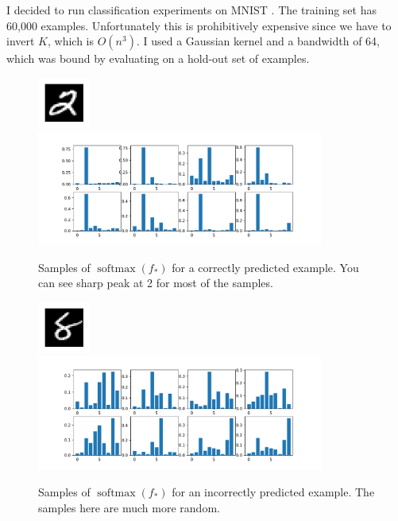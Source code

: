 \documentclass[letterpaper]{article}
\begin{document}
   I decided to run classification experiments on MNIST
   \citep{lecun2010mnist}. The training set has 60,000 examples. Unfortunately
   this is prohibitively expensive since we have to invert $K$, which is
   $O(n^3)$. I used a Gaussian kernel and a bandwidth of 64, which was bound by
   evaluating on a hold-out set of examples.

   \begin{figure}
     \centering
     \includegraphics[width=0.15\textwidth]{2_image.pdf}
     \includegraphics[width=0.84\textwidth]{2_distribution.pdf}
     \caption{Samples of $\operatorname{softmax}(f_*)$ for a correctly predicted
       example. You can see sharp peak at 2 for most of the samples.}
     \label{fig:2}
   \end{figure}

   \begin{figure}
     \centering
     \includegraphics[width=0.15\textwidth]{8_image.pdf}
     \includegraphics[width=0.84\textwidth]{8_distribution.pdf}
     \caption{Samples of $\operatorname{softmax}(f_*)$ for an incorrectly
       predicted example. The samples here are much more random.}
     \label{fig:8}
   \end{figure}
\end{document}
